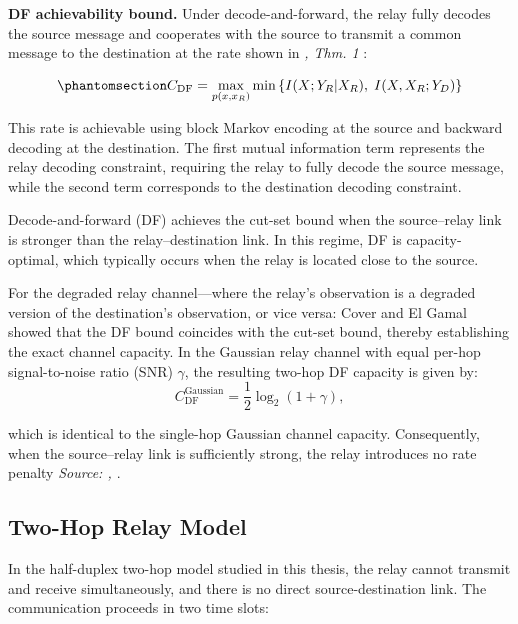\textbf{DF achievability bound.} Under decode-and-forward, the relay fully decodes the source message and cooperates with the source to transmit a common message to the destination at the rate  shown in \small\textit{\cite{CoverGamal1979RelayChannel}, Thm. 1
}:

\begin{equation}\protect\phantomsection\label{eq:df-capacity}{C_{\text{DF}} = \max_{p(x, x_R)} \min\left\{I(X; Y_R | X_R), \; I(X, X_R; Y_D)\right\}
}\end{equation} 

This rate is achievable using block Markov encoding at the source and backward decoding at the destination. 
The first mutual information term represents the relay decoding constraint, requiring the relay to fully decode the source message, while the second term corresponds to the destination decoding constraint.

Decode-and-forward (DF) achieves the cut-set bound when the source–relay link is stronger than the relay–destination link. 
In this regime, DF is capacity-optimal, which typically occurs when the relay is located close to the source.

For the degraded relay channel—where the relay’s observation is a degraded version of the destination’s observation, or vice versa: Cover and El Gamal showed that the DF bound coincides with the cut-set bound, thereby establishing the exact channel capacity.
In the Gaussian relay channel with equal per-hop signal-to-noise ratio (SNR) $\gamma$, the resulting two-hop DF capacity is given by:
\begin{equation}
C_{\text{DF}}^{\text{Gaussian}} = \frac{1}{2}\log_2\left(1 + \gamma\right),
\label{eq:df-gaussian-capacity}
\end{equation}

which is identical to the single-hop Gaussian channel capacity.
Consequently, when the source–relay link is sufficiently strong, the relay introduces no rate penalty \small\textit{Source: \cite[Eq.~(7)]{Laneman2004CooperativeDiversity}, \cite{CoverGamal1979RelayChannel}}.



\subsection{Two-Hop Relay Model}\label{sec:two-hop-relay-model}

In the half-duplex two-hop model studied in this thesis, the relay cannot transmit and receive simultaneously, and there is no direct source-destination link. The communication proceeds in two time slots:

